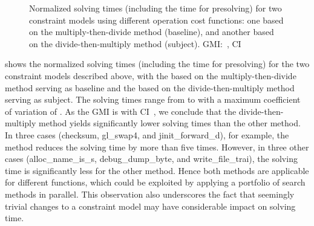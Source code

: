 \begin{figure}
  \centering%
  \maxsizebox{\textwidth}{!}{%
    \trimBarchartPlot{%
    }%
  }

  \caption[%
            Plot for evaluating the operation cost function's impact on
            solving time%
          ]%
          {%
            Normalized solving times (including the time for presolving) for two
            constraint models using different operation cost functions: one
            based on the multiply-then-divide method (baseline), and another
            based on the divide-then-multiply method (subject).
            GMI:~\printGMI{%
              \NewOpCostFunVsOldPrePlusSolvingTimeSpeedupPrePlusSolvingTimeRegularSpeedupGmean%
            },
            CI~\printGMICI{%
              \NewOpCostFunVsOldPrePlusSolvingTimeSpeedupPrePlusSolvingTimeRegularSpeedupCiMin%
            }{%
              \NewOpCostFunVsOldPrePlusSolvingTimeSpeedupPrePlusSolvingTimeRegularSpeedupCiMax%
            }%
          }
\end{figure}

 shows the normalized solving times
(including the time for presolving) for the two \glspl{constraint model}
described above, with the  based on the
\gls{multiply-then-divide method} serving as \gls{baseline} and the
 based on the \gls{divide-then-multiply method}
serving as \gls{subject}.
%
The solving times range from
\SIMinOf{
  \NewOpCostFunVsOldPrePlusSolvingTimeSpeedupPrePlusSolvingTimeAvgMin,
  \NewOpCostFunVsOldPrePlusSolvingTimeSpeedupBaselinePrePlusSolvingTimeAvgMin
}{\s} to
\SIMaxOf[round-precision=0]{
  \NewOpCostFunVsOldPrePlusSolvingTimeSpeedupPrePlusSolvingTimeAvgMax,
  \NewOpCostFunVsOldPrePlusSolvingTimeSpeedupBaselinePrePlusSolvingTimeAvgMax
}{\s} with a maximum coefficient of variation of
\numMaxOf{
  \NewOpCostFunVsOldPrePlusSolvingTimeSpeedupPrePlusSolvingTimeCvMax,
  \NewOpCostFunVsOldPrePlusSolvingTimeSpeedupBaselinePrePlusSolvingTimeCvMax
}.
%
As the \gls{GMI} is \printGMI{%
  \NewOpCostFunVsOldPrePlusSolvingTimeSpeedupPrePlusSolvingTimeRegularSpeedupGmean%
} with \gls{CI}~\printGMICI{%
  \NewOpCostFunVsOldPrePlusSolvingTimeSpeedupPrePlusSolvingTimeRegularSpeedupCiMin%
}{%
  \NewOpCostFunVsOldPrePlusSolvingTimeSpeedupPrePlusSolvingTimeRegularSpeedupCiMax%
}, we conclude that the \gls{divide-then-multiply method} yields significantly
lower solving times than the other method.
%
In three cases ({\codeFont checksum}, {\codeFont gl\_swap4}, and {\codeFont
  jinit\_forward\_d}), for example, the method reduces the solving time by more
than five times.
%
However, in three other cases ({\codeFont alloc\_name\_is\_s}, {\codeFont
  debug\_dump\_byte}, and {\codeFont write\_file\_trai}), the solving time is
significantly less for the other method.
%
Hence both methods are applicable for different \glspl{function}, which could be
exploited by applying a portfolio of \gls{search} methods in parallel.
%
This observation also underscores the fact that seemingly trivial changes to a
\gls{constraint model} may have considerable impact on solving time.


